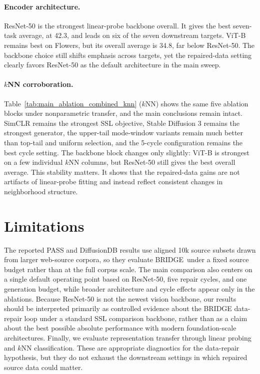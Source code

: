 \documentclass{article}
\newcommand{\method}{BRIDGE}
\begin{document}
\paragraph{Encoder architecture.}
ResNet-50 is the strongest linear-probe backbone overall. It gives the best seven-task average, at 42.3, and leads on six of the seven downstream targets. ViT-B remains best on Flowers, but its overall average is 34.8, far below ResNet-50. The backbone choice still shifts emphasis across targets, yet the repaired-data setting clearly favors ResNet-50 as the default architecture in the main sweep.

\paragraph{$k$NN corroboration.}
Table~\ref{tab:main_ablation_combined_knn} ($k$NN) shows the same five ablation blocks under nonparametric transfer, and the main conclusions remain intact. SimCLR remains the strongest SSL objective, Stable Diffusion 3 remains the strongest generator, the upper-tail mode-window variants remain much better than top-tail and uniform selection, and the 5-cycle configuration remains the best cycle setting. The backbone block changes only slightly: ViT-B is strongest on a few individual $k$NN columns, but ResNet-50 still gives the best overall average. This stability matters. It shows that the repaired-data gains are not artifacts of linear-probe fitting and instead reflect consistent changes in neighborhood structure.



\FloatBarrier


\section{Limitations}
The reported PASS and DiffusionDB results use aligned 10k source subsets drawn from larger web-source corpora, so they evaluate \method\ under a fixed source budget rather than at the full corpus scale. The main comparison also centers on a single default operating point based on ResNet-50, five repair cycles, and one generation budget, while broader architecture and cycle effects appear only in the ablations. Because ResNet-50 is not the newest vision backbone, our results should be interpreted primarily as controlled evidence about the BRIDGE data-repair loop under a standard SSL comparison backbone, rather than as a claim about the best possible absolute performance with modern foundation-scale architectures. Finally, we evaluate representation transfer through linear probing and $k$NN classification. These are appropriate diagnostics for the data-repair hypothesis, but they do not exhaust the downstream settings in which repaired source data could matter.
\end{document}
